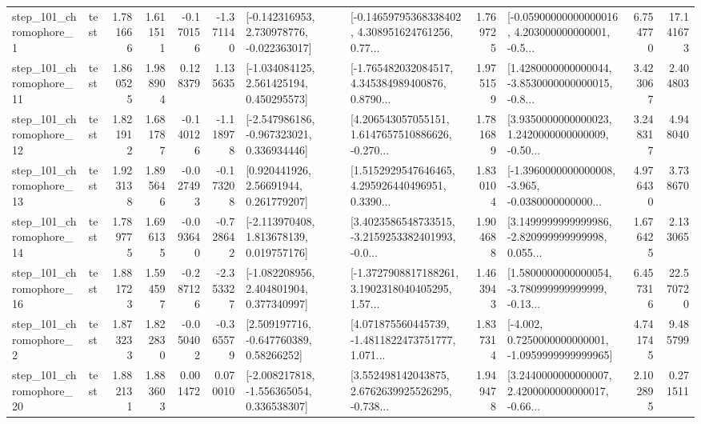 \begin{tabular}{llrrrrllrlrr}
   step\_101\_chromophore\_1 &      test &      1.781666 &    1.611511 &     -0.170156 & -1.371140 &   [-0.142316953, 2.730978776, -0.022363017] &  [-0.14659795368338402, 4.308951624761256, 0.77... &       1.769725 &  [-0.05900000000000016, 4.203000000000001, -0.5... &            6.754770 &         17.141673 \\
  step\_101\_chromophore\_11 &      test &      1.860525 &    1.988904 &      0.128379 &  1.135635 &    [-1.034084125, 2.561425194, 0.450295573] &  [-1.765482032084517, 4.345384989400876, 0.8790... &       1.975159 &  [1.4280000000000044, -3.8530000000000015, -0.8... &            3.423067 &          2.404803 \\
  step\_101\_chromophore\_12 &      test &      1.821912 &    1.681787 &     -0.140126 & -1.118978 &   [-2.547986186, -0.967323021, 0.336934446] &  [4.206543057055151, 1.6147657510886626, -0.270... &       1.781689 &  [3.9350000000000023, 1.2420000000000009, -0.50... &            3.248317 &          4.948040 \\
  step\_101\_chromophore\_13 &      test &      1.923138 &    1.895646 &     -0.027493 & -0.173208 &      [0.920441926, 2.56691944, 0.261779207] &  [1.5152929547646465, 4.295926440496951, 0.3390... &       1.830104 &  [-1.3960000000000008, -3.965, -0.0380000000000... &            4.976430 &          3.738670 \\
  step\_101\_chromophore\_14 &      test &      1.789775 &    1.696135 &     -0.093640 & -0.728642 &    [-2.113970408, 1.813678139, 0.019757176] &  [3.4023586548733515, -3.2159253382401993, -0.0... &       1.904688 &  [3.1499999999999986, -2.820999999999998, 0.055... &            1.676425 &          2.133065 \\
  step\_101\_chromophore\_16 &      test &      1.881723 &    1.594597 &     -0.287126 & -2.353327 &    [-1.082208956, 2.404801904, 0.377340997] &  [-1.3727908817188261, 3.1902318040405295, 1.57... &       1.463943 &  [1.5800000000000054, -3.780999999999999, -0.13... &            6.457316 &         22.570720 \\
   step\_101\_chromophore\_2 &      test &      1.873233 &    1.822830 &     -0.050402 & -0.365579 &     [2.509197716, -0.647760389, 0.58266252] &  [4.071875560445739, -1.4811822473751777, 1.071... &       1.837314 &  [-4.002, 0.7250000000000001, -1.0959999999999965] &            4.741745 &          9.485799 \\
  step\_101\_chromophore\_20 &      test &      1.882131 &    1.883603 &      0.001472 &  0.070010 &   [-2.008217818, -1.556365054, 0.336538307] &  [3.552498142043875, 2.6762639925526295, -0.738... &       1.949478 &  [3.2440000000000007, 2.4200000000000017, -0.66... &            2.102895 &          0.271511 \\

\end{tabular}
